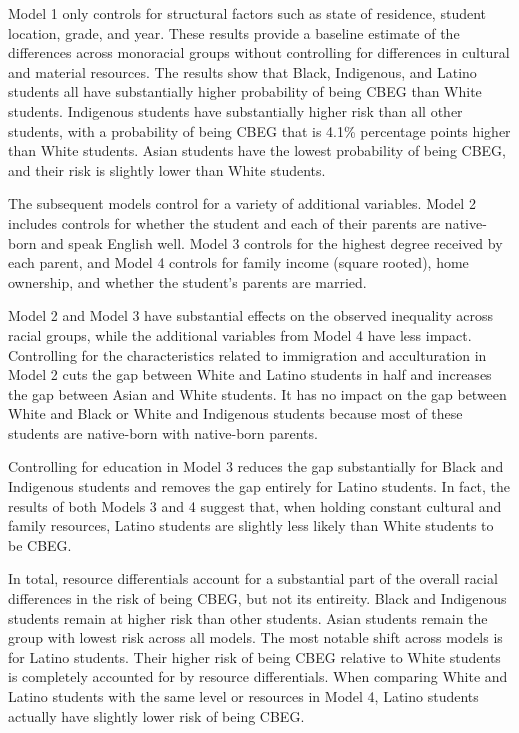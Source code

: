 \documentclass[
  letterpaper,
  DIV=11,
  numbers=noendperiod]{scrartcl}
\begin{document}
Model 1 only controls for structural factors such as state of residence,
student location, grade, and year. These results provide a baseline
estimate of the differences across monoracial groups without controlling
for differences in cultural and material resources. The results show
that Black, Indigenous, and Latino students all have substantially
higher probability of being CBEG than White students. Indigenous
students have substantially higher risk than all other students, with a
probability of being CBEG that is 4.1\% percentage points higher than
White students. Asian students have the lowest probability of being
CBEG, and their risk is slightly lower than White students.

The subsequent models control for a variety of additional variables.
Model 2 includes controls for whether the student and each of their
parents are native-born and speak English well. Model 3 controls for the
highest degree received by each parent, and Model 4 controls for family
income (square rooted), home ownership, and whether the student's
parents are married.

Model 2 and Model 3 have substantial effects on the observed inequality
across racial groups, while the additional variables from Model 4 have
less impact. Controlling for the characteristics related to immigration
and acculturation in Model 2 cuts the gap between White and Latino
students in half and increases the gap between Asian and White students.
It has no impact on the gap between White and Black or White and
Indigenous students because most of these students are native-born with
native-born parents.

Controlling for education in Model 3 reduces the gap substantially for
Black and Indigenous students and removes the gap entirely for Latino
students. In fact, the results of both Models 3 and 4 suggest that, when
holding constant cultural and family resources, Latino students are
slightly less likely than White students to be CBEG.

In total, resource differentials account for a substantial part of the
overall racial differences in the risk of being CBEG, but not its
entireity. Black and Indigenous students remain at higher risk than
other students. Asian students remain the group with lowest risk across
all models. The most notable shift across models is for Latino students.
Their higher risk of being CBEG relative to White students is completely
accounted for by resource differentials. When comparing White and Latino
students with the same level or resources in Model 4, Latino students
actually have slightly lower risk of being CBEG.
\end{document}
